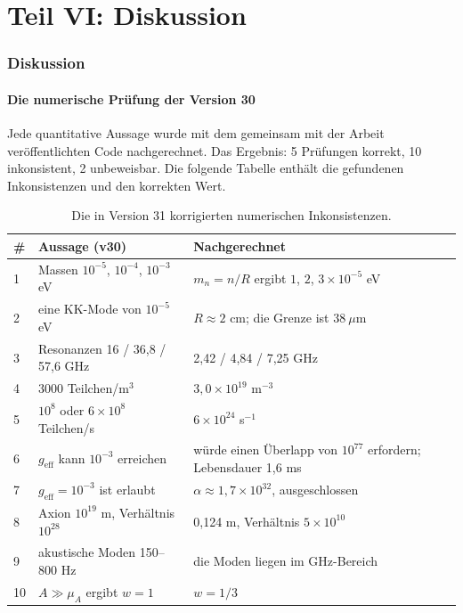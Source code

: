 \part*{Teil VI: Diskussion}

\section{Diskussion}
\subsection{Die numerische Prüfung der Version 30}
Jede quantitative Aussage wurde mit dem gemeinsam mit der Arbeit veröffentlichten Code nachgerechnet. Das Ergebnis: 5 Prüfungen korrekt, 10 inkonsistent, 2 unbeweisbar. Die folgende Tabelle enthält die gefundenen Inkonsistenzen und den korrekten Wert.

\begin{table}[H]
\centering
\small
\begin{tabular}{@{}p{0.5cm}p{6.2cm}p{5.2cm}@{}}
\toprule
\# & \textbf{Aussage (v30)} & \textbf{Nachgerechnet} \\ \midrule
1 & Massen $10^{-5}$, $10^{-4}$, $10^{-3}$ eV & $m_n = n/R$ ergibt $1$, $2$, $3 \times 10^{-5}$ eV \\
2 & eine KK-Mode von $10^{-5}$ eV & $R \approx 2$ cm; die Grenze ist $38\ \mu$m \\
3 & Resonanzen 16 / 36,8 / 57,6 GHz & 2,42 / 4,84 / 7,25 GHz \\
4 & 3000 Teilchen/m$^3$ & $3,0\times10^{19}$ m$^{-3}$ \\
5 & $10^8$ oder $6\times10^8$ Teilchen/s & $6\times10^{24}$ s$^{-1}$ \\
6 & $g_{\text{eff}}$ kann $10^{-3}$ erreichen & würde einen Überlapp von $10^{77}$ erfordern; Lebensdauer 1,6 ms \\
7 & $g_{\text{eff}} = 10^{-3}$ ist erlaubt & $\alpha \approx 1,7\times10^{32}$, ausgeschlossen \\
8 & Axion $10^{19}$ m, Verhältnis $10^{28}$ & 0,124 m, Verhältnis $5\times10^{10}$ \\
9 & akustische Moden 150--800 Hz & die Moden liegen im GHz-Bereich \\
10 & $A \gg \mu_A$ ergibt $w = 1$ & $w = 1/3$ \\ \bottomrule
\end{tabular}
\caption{Die in Version 31 korrigierten numerischen Inkonsistenzen.}
\label{tab:audit}
\end{table}

